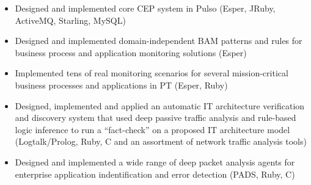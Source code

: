 \documentclass[a4paper,10pt]{scrartcl} %
\begin{document}
\begin{cv}{}
  \Sep




   {
  \begin{itemize}[nosep,noitemsep,leftmargin=3.85em]
    \item Designed and implemented core CEP system in Pulso (Esper, JRuby, ActiveMQ, Starling, MySQL)
    \item Designed and implemented domain-independent BAM patterns and rules for business process and application monitoring solutions (Esper)
    \item Implemented tens of real monitoring scenarios for several mission-critical business processes and applications in PT (Esper, Ruby)
  \end{itemize}
  }

  \Sep


  
   {
  \begin{itemize}[nosep,noitemsep,leftmargin=3.85em]
    \item Designed, implemented and applied an automatic IT architecture verification and discovery system that used deep passive traffic analysis and rule-based logic inference to run a ``fact-check'' on a proposed IT architecture model (Logtalk/Prolog, Ruby, C and an assortment of network traffic analysis tools)
    \item Designed and implemented a wide range of deep packet analysis agents for enterprise application indentification and error detection (PADS, Ruby, C)
  \end{itemize}
  }

  \Sep




\end{cv}
\end{document}
